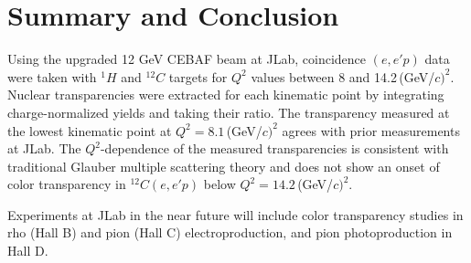 \chapter{Summary and Conclusion}
Using the upgraded 12\,\,GeV CEBAF beam at JLab, coincidence $(e,e'p)$ data
were taken with $^{1}H$ and $^{12}C$ targets for $Q^2$ values between 8 and
14.2\,(GeV/$c)^2$.
Nuclear transparencies were extracted for each kinematic point by integrating
charge-normalized yields and taking their ratio.
The transparency measured at the lowest kinematic point at
$Q^2=8.1$\,(GeV/$c)^2$ agrees with prior measurements at JLab.
The $Q^2$-dependence of the measured transparencies is consistent with
traditional Glauber multiple scattering theory and does not show an onset of
color transparency in $^{12}C(e,e'p)$ below $Q^2=14.2$\,(GeV/$c)^2$.

Experiments at JLab in the near future will include color transparency studies
in rho (Hall B) and pion (Hall C) electroproduction, and pion photoproduction
in Hall D.
